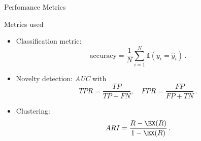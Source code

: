 \begin{frame}{Perfomance Metrics}
    \begin{normalblock}{Metrics used}
        \begin{itemize}
          \item<1-> Classification metric:
          \[
              \text{accuracy} = \frac{1}{N}\sum_{i=1}^N \mathds{1} (y_i = \hat{y}_i)\,.
          \]
          \item<2-> Novelty detection: \emph{AUC} with 
          \[
              TPR = \frac{TP}{TP+FN}, \quad FPR = \frac{FP}{FP+TN}\,.
          \]
          \item<3-> Clustering: 
          \[
              ARI = \frac{R-\EX(R)}{1-\EX(R)}\,.
          \]
        \end{itemize}
    \end{normalblock}
\end{frame}
